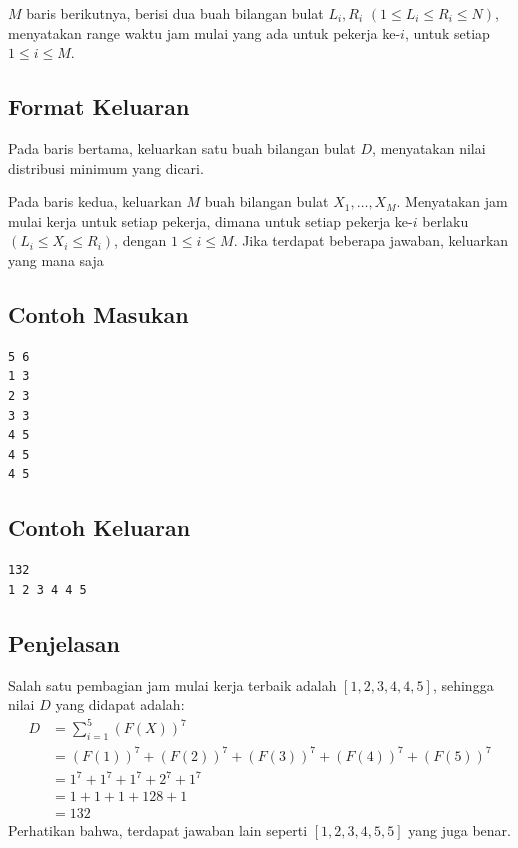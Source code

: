 \documentclass{article}
\begin{document}
$M$ baris berikutnya, berisi dua buah bilangan bulat $L_i, R_i$ $(1 \leq L_i \leq R_i \leq N)$, menyatakan range waktu jam mulai yang ada untuk pekerja ke-$i$, untuk setiap $1 \leq i \leq M$.

\subsection*{Format Keluaran}

Pada baris bertama, keluarkan satu buah bilangan bulat $D$, menyatakan nilai distribusi minimum yang dicari.

Pada baris kedua, keluarkan $M$ buah bilangan bulat $X_1, \dots, X_M$. Menyatakan jam mulai kerja untuk setiap pekerja, dimana untuk setiap pekerja ke-$i$ berlaku $(L_i \leq X_i \leq R_i)$, dengan $1 \leq i \leq M$. Jika terdapat beberapa jawaban, keluarkan yang mana saja

\begin{multicols}{2}
\subsection*{Contoh Masukan}
\begin{lstlisting}
5 6
1 3
2 3
3 3
4 5
4 5
4 5

\end{lstlisting}
\columnbreak
\subsection*{Contoh Keluaran}
\begin{lstlisting}
132
1 2 3 4 4 5
\end{lstlisting}
\vfill
\null
\end{multicols}

\subsection*{Penjelasan}

Salah satu pembagian jam mulai kerja terbaik adalah $\left[1, 2, 3, 4, 4, 5\right]$, sehingga nilai $D$ yang didapat adalah:
\begin{align*}
D &= \sum_{i = 1}^{5} (F(X))^7 \\
  &= (F(1))^7 + (F(2))^7 + (F(3))^7 + (F(4))^7 + (F(5))^7 \\
  &= 1^7 + 1^7 + 1^7 + 2^7 + 1^7 \\
  &= 1 + 1 + 1 + 128 + 1 \\
  &= 132
\end{align*}
Perhatikan bahwa, terdapat jawaban lain seperti $\left[1, 2, 3, 4, 5, 5\right]$ yang juga benar.
\end{document}
